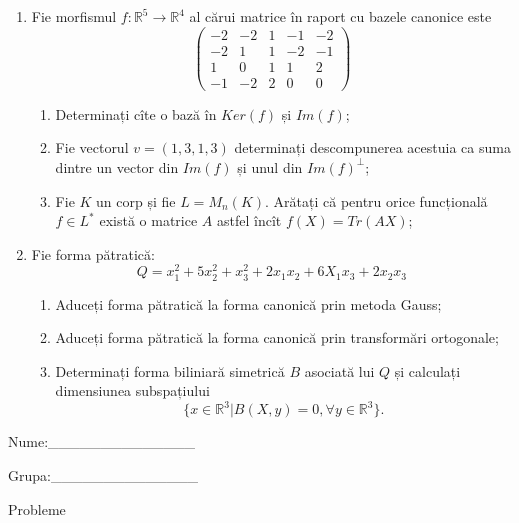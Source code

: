 \documentclass{article}
\begin{document}
\begin{enumerate}
 \item Fie morfismul $f:\mathbb{R}^5 \to \mathbb{R}^4$ al cărui matrice în raport cu bazele canonice este
$$\begin{pmatrix}
-2&-2&1&-1&-2\\
-2&1&1&-2&-1\\
1&0&1&1&2\\
-1&-2&2&0&0
\end{pmatrix}$$

\begin{enumerate}
\item Determinați cîte o bază în $Ker(f)$ și $Im(f)$;
\item Fie vectorul $v=(1,3,1,3)$ determinați descompunerea acestuia ca suma dintre un vector din $Im(f)$ și unul din $Im(f)^\perp$;
\item Fie $K$ un corp și fie $L=M_n(K)$. Arătați că pentru orice funcțională $f \in L^*$ există o matrice $A$ astfel încît $f(X)=Tr(AX)$;
\end{enumerate}
\item Fie forma pătratică:
$$Q= x_1^2+5x_2^2+x_3^2+2x_1x_2+6X_1x_3+2x_2x_3$$

\begin{enumerate}
\item Aduceți forma pătratică la forma canonică prin metoda Gauss;
\item Aduceți forma pătratică la forma canonică prin transformări ortogonale;
\item Determinați forma biliniară simetrică $B$ asociată lui $Q$ și calculați dimensiunea subspațiului
$$\{x \in \mathbb{R}^3 | B(X,y)=0,\forall y \in \mathbb{R}^3\}.$$

\end{enumerate}
\end{enumerate}
\newpage
\begin{flushright}
Nume:\_\_\_\_\_\_\_\_\_\_\_\_\_\_
 
 
Grupa:\_\_\_\_\_\_\_\_\_\_\_\_\_\_
\end{flushright}
\begin{center}
\vspace{2cm}
{\Large Probleme}
\vspace{2cm}
\end{center}
\end{document}
